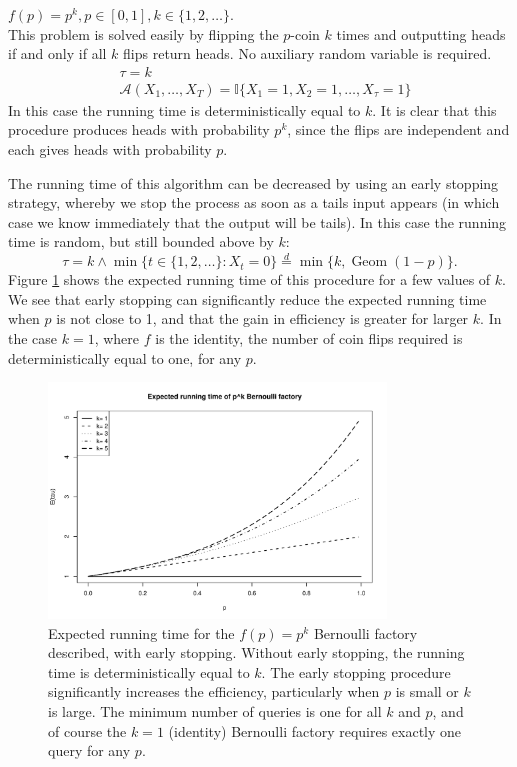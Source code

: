 \documentclass{article}
\theoremstyle{definition}
\newenvironment{example}
  {\pushQED{\qed}\renewcommand{\qedsymbol}{$\triangle$}\examplex}
  {\popQED\endexamplex}
\newcommand{\eqdist}{\overset{d}{=}}
\newcommand{\Geom}{\operatorname{Geom}}
\newcommand{\A}{\mathcal{A}}
\begin{document}
\begin{example}\label{ex:bf_pk}
$f(p) = p^k, p\in[0,1], k\in\{1,2,\dots\}$.\\
This problem is solved easily by flipping the $p$-coin $k$ times and outputting heads if and only if all $k$ flips return heads. No auxiliary random variable is required.
\begin{align*}
& \tau = k \\
& \A(X_1,\dots,X_T) = \mathbb{I}\{X_1 =1, X_2=1 ,\dots,X_\tau=1\}
\end{align*}
In this case the running time is deterministically equal to $k$. It is clear that this procedure produces heads with probability $p^k$, since the flips are independent and each gives heads with probability $p$.

The running time of this algorithm can be decreased by using an early stopping strategy, whereby we stop the process as soon as a tails input appears (in which case we know immediately that the output will be tails). In this case the running time is random, but still bounded above by $k$:
\begin{equation*}
\tau = k \wedge \min\{t \in \{1,2,\dots\}:X_t=0 \} \eqdist \min\{k, \Geom(1-p)\}.
\end{equation*}
Figure \ref{fig:p2_runtime} shows the expected running time of this procedure for a few values of $k$. We see that early stopping can significantly reduce the expected running time when $p$ is not close to 1, and that the gain in efficiency is greater for larger $k$. In the case $k=1$, where $f$ is the identity, the number of coin flips required is deterministically equal to one, for any $p$.
\begin{figure}
\centering
\includegraphics[width=0.8\textwidth]{pk_runtime.pdf}
\caption{Expected running time for the $f(p)=p^k$ Bernoulli factory described, with early stopping. Without early stopping, the running time is deterministically equal to $k$. The early stopping procedure significantly increases the efficiency, particularly when $p$ is small or $k$ is large. The minimum number of queries is one for all $k$ and $p$, and of course the $k=1$ (identity) Bernoulli factory requires exactly one query for any $p$.}\label{fig:p2_runtime}
\end{figure}
\end{example}
\end{document}
